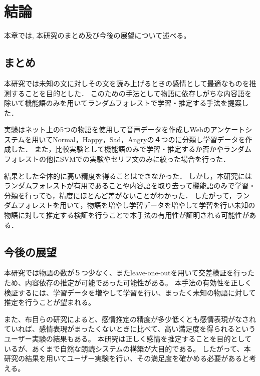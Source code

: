 \chapter{結論}

本章では, 本研究のまとめ及び今後の展望について述べる。

\section{まとめ}
本研究では未知の文に対しその文を読み上げるときの感情として最適なものを推測することを目的とした．
このための手法として物語に依存しがちな内容語を除いて機能語のみを用いてランダムフォレストで学習・推定する手法を提案した．


実験はネット上の5つの物語を使用して音声データを作成しWebのアンケートシステムを用いてNormal，Happy，Sad，Angryの４つのに分類し学習データを作成した．
また，比較実験として機能語のみで学習・推定するか否かやランダムフォレストの他にSVMでの実験やセリフ文のみに絞った場合を行った．


結果とした全体的に高い精度を得ることはできなかった．
しかし，本研究にはランダムフォレストが有用であることや内容語を取り去って機能語のみで学習・分類を行っても，精度にほとんど差がないことがわかった．
したがって，ランダムフォレストを用いて，物語を増やし学習データを増やして学習を行い未知の物語に対して推定する検証を行うことで本手法の有用性が証明される可能性がある．

\section{今後の展望}
本研究では物語の数が５つ少なく、またleave-one-outを用いて交差検証を行ったため、内容依存の推定が可能であった可能性がある。
本手法の有効性を正しく検証するには、学習データを増やして学習を行い、まったく未知の物語に対して推定を行うことが望まれる。

また、布目ら\cite{fume}の研究によると、感情推定の精度が多少低くとも感情表現がなされていれば、感情表現がまったくないときに比べて、高い満足度を得られるというユーザー実験の結果もある。
本研究は正しく感情を推定することを目的としているが、あくまで自然な朗読システムの構築が大目的である。
したがって、本研究の結果を用いてユーザー実験を行い、その満足度を確かめる必要があると考える。


